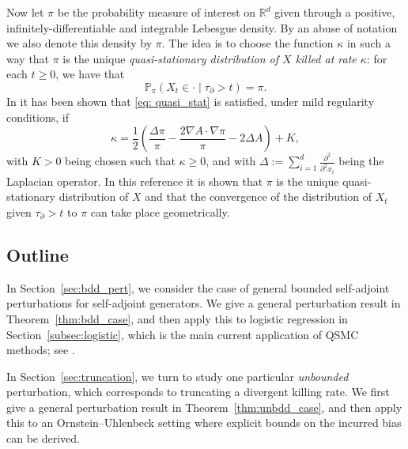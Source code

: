 \documentclass{aptpub}
\renewcommand{\P}{\mathbb P}
\newcommand{\taud}{\tau_\partial}
\begin{document}
Now let $\pi$ be the probability measure of interest on $\mathbb{R}^d$ given through a positive, infinitely-differentiable and integrable Lebesgue density. By an abuse of notation we also denote this density by $\pi$. The idea is to choose the function $\kappa$ in such a way that $\pi$ is 
the unique \textit{quasi-stationary distribution of $X$ killed at rate $\kappa$}: for each $t\ge 0$, we have that
\begin{equation}
\label{eq: quasi_stat}
    \P_\pi (X_t \in \cdot \mid \taud>t)=\pi.
\end{equation}
In \cite{Wang2019TheoQSMC} it has been shown that \eqref{eq: quasi_stat} is satisfied, under mild regularity conditions, if 
\begin{equation}
    \kappa = \frac{1}{2}\left( \frac{\Delta \pi}{\pi} -\frac{2\nabla A \cdot \nabla \pi}{\pi} -2\Delta A \right)+K,
    \label{eq:kappa_QSMC}
\end{equation}
with $K>0$ being chosen such that $\kappa\geq0$, and with $\Delta := \sum_{i=1}^d \frac{\partial^2}{\partial^2 x_i}$ being the Laplacian operator. In this reference it is shown that $\pi$ is the unique quasi-stationary distribution of $X$ and that the convergence of the distribution of $X_t$ given $\tau_\partial >t$ to $\pi$ can take place geometrically.





\subsection{Outline}



In Section~\ref{sec:bdd_pert}, we consider the case of general bounded self-adjoint perturbations for self-adjoint generators. We give a general perturbation result in Theorem~\ref{thm:bdd_case}, and then apply this to logistic regression in Section~\ref{subsec:logistic}, which is the main current application of QSMC methods; see \cite{Pollock2020, Kumar2019}.

In Section~\ref{sec:truncation}, we turn to study one particular \textit{unbounded} perturbation, which corresponds to truncating a divergent killing rate. We first give a general perturbation result in Theorem~\ref{thm:unbdd_case}, and then apply this to an  Ornstein--Uhlenbeck setting where explicit bounds on the incurred bias can be derived.
\end{document}
